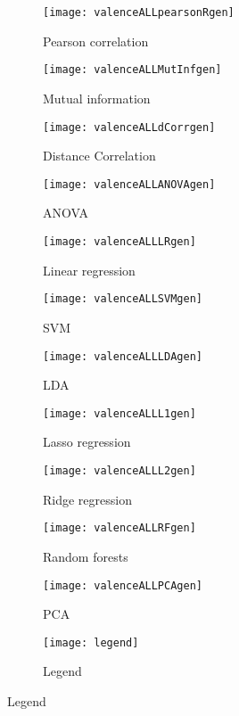 \clearpage

\begin{figure}[!tbp]
  \centering
  \caption{Selection features for valence classification.\label{valencepiesgen}}
  \begin{subfigure}[b]{0.3\textwidth}
    \texttt{[image: valenceALLpearsonRgen]}
    \caption{Pearson correlation}
  \end{subfigure}
  \hfill
  \begin{subfigure}[b]{0.3\textwidth}
    \texttt{[image: valenceALLMutInfgen]}
    \caption{Mutual information}
  \end{subfigure}
  \hfill
  \begin{subfigure}[b]{0.3\textwidth}
    \texttt{[image: valenceALLdCorrgen]}
    \caption{Distance Correlation}
  \end{subfigure}
  
  \begin{subfigure}[b]{0.3\textwidth}
    \texttt{[image: valenceALLANOVAgen]}
    \caption{ANOVA}
  \end{subfigure}
  \hfill
  \begin{subfigure}[b]{0.3\textwidth}
    \texttt{[image: valenceALLLRgen]}
    \caption{Linear regression}
  \end{subfigure}
  \hfill
  \begin{subfigure}[b]{0.3\textwidth}
    \texttt{[image: valenceALLSVMgen]}
    \caption{SVM}
  \end{subfigure}
  
  \begin{subfigure}[b]{0.3\textwidth}
    \texttt{[image: valenceALLLDAgen]}
    \caption{LDA}
  \end{subfigure}
  \hfill
  \begin{subfigure}[b]{0.3\textwidth}
    \texttt{[image: valenceALLL1gen]}
    \caption{Lasso regression}
  \end{subfigure}
  \hfill
  \begin{subfigure}[b]{0.3\textwidth}
    \texttt{[image: valenceALLL2gen]}
    \caption{Ridge regression}
  \end{subfigure}
  
  \begin{subfigure}[b]{0.3\textwidth}
    \texttt{[image: valenceALLRFgen]}
    \caption{Random forests}
  \end{subfigure}
  \hfill
  \begin{subfigure}[b]{0.3\textwidth}
    \texttt{[image: valenceALLPCAgen]}
    \caption{PCA}
  \end{subfigure}
  \hfill
  \begin{subfigure}[b]{0.3\textwidth}
    \texttt{[image: legend]}
    \caption{Legend\label{valencepieslegendgen}}
  \end{subfigure}
\end{figure}
\clearpage

